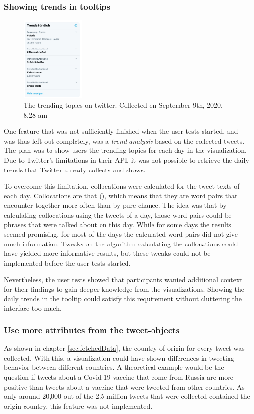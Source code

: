 \subsubsection*{Showing trends in tooltips}
\begin{figure}
    \includegraphics[width=0.28\textwidth]{images/twitter_trends.jpg}
    \caption{The trending topics on twitter. Collected on September 9th, 2020, 8.28 am}
    \label{fig:twitter_trends}
\end{figure}
One feature that was not sufficiently finished when the user tests started, and was thus left out completely, was a \emph{trend analysis} based on the collected tweets. The plan was to show users the trending topics for each day in the visualization. Due to Twitter's limitations in their API, it was not possible to retrieve the daily trends that Twitter already collects and shows.

To overcome this limitation, collocations were calculated for the tweet texts of each day. Collocations are  that  (\cite[2]{mckeown2000collocations}), which means that they are word pairs that encounter together more often than by pure chance. The idea was that by calculating collocations using the tweets of a day, those word pairs could be phrases that were talked about on this day. While for some days the results seemed promising, for most of the days the calculated word pairs did not give much information. Tweaks on the algorithm calculating the collocations could have yielded more informative results, but these tweaks could not be implemented before the user tests started.

Nevertheless, the user tests showed that participants wanted additional context for their findings to gain deeper knowledge from the visualizations. Showing the daily trends in the tooltip could satisfy this requirement without cluttering the interface too much.

\subsubsection*{Use more attributes from the tweet-objects}
As shown in chapter \ref{sec:fetchedData}, the country of origin for every tweet was collected. With this, a visualization could have shown differences in tweeting behavior between different countries. A theoretical example would be the question if tweets about a Covid-19 vaccine that come from Russia are more positive than tweets about a vaccine that were tweeted from other countries. As only around 20,000 out of the 2.5 million tweets that were collected contained the origin country, this feature was not implemented.

